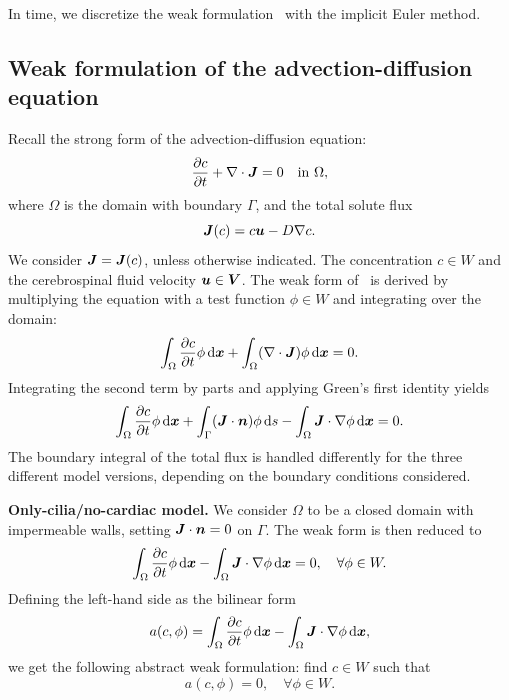 \documentclass{WileyMSP-template}
\begin{document}
In time, we discretize the weak formulation~
with the implicit Euler method.

\subsection{Weak formulation of the advection-diffusion equation}
\label{subsec:adv_diff_eq_weak_form}
Recall the strong form of the advection-diffusion equation:
\begin{equation}
    \frac{\partial c}{\partial t} + \nabla\cdot\bm{J} = 0 \quad\mathrm{in} \ \Omega,
    \label{eq:adv_diff_strong_DG}
\end{equation}
where $\Omega$ is the domain with boundary $\Gamma$, and the total solute flux
\begin{equation*}
    \bm{J}(c) = c\bm{u} - D\nabla c.
\end{equation*}
We consider $\bm{J} = \bm{J}(c)$, unless otherwise indicated.
The concentration $c\in W$ and the cerebrospinal fluid velocity $\bm{u}\in\bm{V}$.
The weak form of~ is derived by
multiplying the equation with a test function $\phi \in W$ and integrating over the domain: 
\begin{equation*}
    \int_{\Omega}\frac{\partial c}{\partial t}\phi \, \mathrm d\bm{x} + \int_{\Omega}(\nabla\cdot\bm{J})\phi \, \mathrm d\bm{x} = 0.
\end{equation*}
Integrating the second term by parts and applying Green's first identity yields
\begin{equation}
    \int_{\Omega}\frac{\partial c}{\partial t}\phi \, \mathrm d\bm{x} + \int_{\Gamma}(\bm{J}\cdot\bm{n})\phi \, \mathrm ds
    - \int_{\Omega}\bm{J}\cdot\nabla\phi \, \mathrm d\bm{x} = 0.\label{eq:adv_diff_weak_formA1}
\end{equation}
The boundary integral of the total flux is handled differently for
the three different model versions, depending on the boundary conditions considered.

\textbf{Only-cilia/no-cardiac model.} We consider $\Omega$ to be
a closed domain with impermeable walls, setting $\bm{J}\cdot\bm{n}=0$ on $\Gamma$.
The weak form is then reduced to
\begin{equation*}
    \int_{\Omega}\frac{\partial c}{\partial t}\phi \, \mathrm d\bm{x} - \int_{\Omega}\bm{J}\cdot\nabla\phi \, \mathrm d\bm{x} = 0, \quad\forall\phi\in W.
\end{equation*}
Defining the left-hand side as the bilinear form
\begin{equation*}
    a(c, \phi) = \int_{\Omega}\frac{\partial c}{\partial t}\phi \, \mathrm d\bm{x} - \int_{\Omega}\bm{J}\cdot\nabla\phi \, \mathrm d\bm{x}, 
\end{equation*}
we get the following abstract weak formulation: find $c\in W$ such that
\begin{equation*}
    a(c, \phi) = 0, \quad\forall\phi\in W.
\end{equation*}
\end{document}
